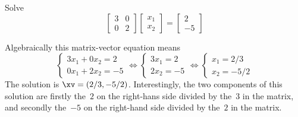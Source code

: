 \begin{example} \label{eg:}
Solve \begin{equation*}
\begin{bmatrix} 3&0\\0&2 \end{bmatrix}
\begin{bmatrix} x_1\\x_2 \end{bmatrix}
=\begin{bmatrix} 2\\-5 \end{bmatrix}
\end{equation*}
\begin{solution}
Algebraically this matrix-vector equation means
\begin{equation*}
\begin{cases} 3x_1+0x_2=2 \\ 0x_1+2x_2=-5\end{cases}
\iff
\begin{cases} 3x_1=2 \\ 2x_2=-5\end{cases}
\iff
\begin{cases} x_1=2/3 \\ x_2=-5/2\end{cases}
\end{equation*}
The solution is \(\xv=(2/3,-5/2)\).
Interestingly, the two components of this solution are firstly the~\(2\) on the right-hans side divided by the~\(3\) in the matrix, and secondly the~\(-5\) on the right-hand side divided by the~\(2\) in the matrix.
\end{solution}
\end{example}






